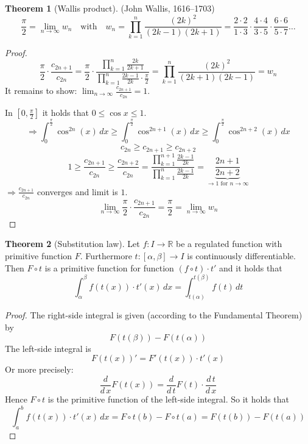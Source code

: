 \documentclass[a4paper,landscape,twocolumn]{article}
\theoremstyle{definition}
\newtheorem{theorem}{Theorem}
\begin{document}
\begin{theorem}[Wallis product]
  (John Wallis, 1616--1703)
  \[
    \frac\pi2 = \lim_{n\to\infty} w_n
    \quad \text{with} \quad
    w_n = \prod_{k=1}^n \frac{(2k)^2}{(2k-1)(2k+1)}
    = \frac{2 \cdot 2}{1 \cdot 3} \cdot \frac{4 \cdot 4}{3 \cdot 5} \cdot \frac{6 \cdot 6}{5 \cdot 7} \ldots
  \]
\end{theorem}
\begin{proof}
  \[
    \frac\pi2 \cdot \frac{c_{2n+1}}{c_{2n}}
      = \frac\pi2 \cdot \frac{\prod_{k=1}^n \frac{2k}{2k+1}}{\prod_{k=1}^n \frac{2k-1}{2k} \cdot \frac\pi2}
      = \prod_{k=1}^n \frac{(2k)^2}{(2k + 1)(2k - 1)} = w_n
  \]
  It remains to show: $\lim_{n\to\infty} \frac{c_{2n+1}}{c_{2n}} = 1$.

  In $\left[0, \frac\pi2\right]$ it holds that $0 \leq \cos{x} \leq 1$.
  \[
    \Rightarrow \int_0^{\frac\pi2} \cos^{2n}(x) \, dx
    \geq \int_0^{\frac\pi2} \cos^{2n+1}(x) \, dx
    \geq \int_0^{\frac\pi2} \cos^{2n+2}(x) \, dx
  \] \[
    c_{2n} \geq c_{2n+1} \geq c_{2n+2}
  \] \[
    1 \geq \frac{c_{2n+1}}{c_{2n}} \geq \frac{c_{2n+2}}{c_{2n}}
    = \frac{\prod_{k=1}^{n+1} \frac{2k - 1}{2k}}{\prod_{k=1}^n \frac{2k - 1}{2k}}
    = \underbrace{\frac{2n+1}{2n+2}}_{\to 1 \text{ for } n \to \infty}
  \]
  $\Rightarrow \frac{c_{2n+1}}{c_{2n}}$ converges and limit is $1$.
  \[ \lim_{n\to\infty} \frac{\pi}2 \cdot \frac{c_{2n+1}}{c_{2n}} = \frac\pi2 = \lim_{n\to\infty} w_n \]
\end{proof}

\begin{theorem}[Substitution law]
  Let $f: I \to \mathbb R$ be a regulated function with primitive function
  $F$. Furthermore $t: [\alpha, \beta] \to I$ is continuously differentiable.
  Then $F \circ t$ is a primitive function for function $(f \circ t) \cdot t'$
  and it holds that
  \[
    \int_{\alpha}^\beta f(t(x)) \cdot t'(x) \, dx
      = \int_{t(\alpha)}^{t(\beta)} f(t) \, dt
  \]
\end{theorem}

\begin{proof}
  The right-side integral is given (according to the Fundamental Theorem) by
  \[ F(t(\beta)) - F(t(\alpha)) \]
  The left-side integral is
  \[ F(t(x))' = F'(t(x)) \cdot t'(x) \]
  Or more precisely:
  \[ \frac{d}{d\,x} F(t(x)) = \frac{d}{d\,t} F(t) \cdot \frac{d\,t}{d\,x} \]
  Hence $F \circ t$ is the primitive function of the left-side integral.
  So it holds that
  \[
    \int_a^b f(t(x)) \cdot t'(x) \, dx
    = F \circ t(b) - F \circ t(a)
    = F(t(b)) - F(t(a))
  \]
\end{proof}
\end{document}

